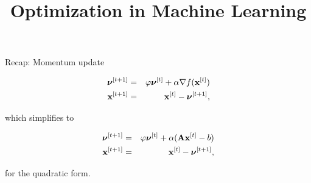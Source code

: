 \documentclass[11pt,compress,t,notes=noshow, xcolor=table]{beamer}
\title{Optimization in Machine Learning}
\date{}
\begin{document}
\sloppy

\begin{vbframe}{Recap: Momentum update}

\begin{eqnarray*}
 \boldsymbol{\nu}^{[ t+1 ] } &=& \varphi \boldsymbol{\nu}^{[ t ] } + \alpha \nabla f(\mathbf{x}^{[ t ] }) \\
 \mathbf{x}^{[ t+1 ] } &=& \mathbf{x}^{[ t ] } - \boldsymbol{\nu}^{[ t+1 ] }, 
\end{eqnarray*}

which simplifies to 

\begin{eqnarray*}
	\boldsymbol{\nu}^{[ t+1 ] } &=& \varphi \boldsymbol{\nu}^{[ t ] } + \alpha (\mathbf{A} \mathbf{x}^{[ t ] } - b)  \\
	\mathbf{x}^{[ t+1 ] } &=& \mathbf{x}^{[ t ] } - \boldsymbol{\nu}^{[ t+1 ] }, 
\end{eqnarray*}

for the quadratic form. 

\end{vbframe}
\end{document}
